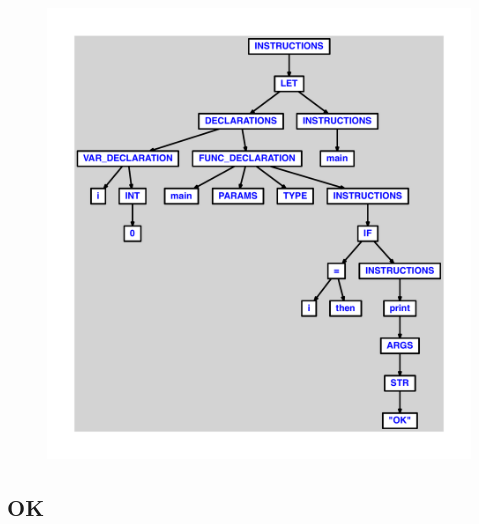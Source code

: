 \documentclass{article}
\begin{document}
\begin{figure}[H]\centering\includegraphics[max width=\textwidth]{ast/ast_166.pdf}\end{figure}\subsection{OK}
\end{document}
